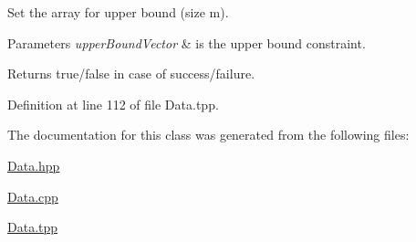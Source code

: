 Set the array for upper bound (size m). 


\begin{DoxyParams}{Parameters}
{\em upper\+Bound\+Vector} & is the upper bound constraint. \\
\hline
\end{DoxyParams}
\begin{DoxyReturn}{Returns}
true/false in case of success/failure. 
\end{DoxyReturn}


Definition at line 112 of file Data.\+tpp.



The documentation for this class was generated from the following files\+:\begin{DoxyCompactItemize}
\item 
\hyperlink{Data_8hpp}{Data.\+hpp}\item 
\hyperlink{Data_8cpp}{Data.\+cpp}\item 
\hyperlink{Data_8tpp}{Data.\+tpp}\end{DoxyCompactItemize}
